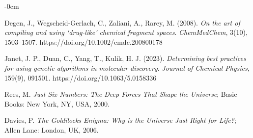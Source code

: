\documentclass[life,article,submit,pdftex,moreauthors]{Definitions/mdpi}
\begin{document}
\begin{adjustwidth}{-\extralength}{0cm}
{\begin{thebibliography}{999}
Degen, J., Wegscheid-Gerlach, C., Zaliani, A., Rarey, M. (2008).
\textit{On the art of compiling and using ‘drug-like’ chemical fragment spaces}.
\textit{ChemMedChem}, 3(10), 1503–1507. https://doi.org/10.1002/cmdc.200800178

Janet, J. P., Duan, C., Yang, T., Kulik, H. J. (2023).
\textit{Determining best practices for using genetic algorithms in molecular discovery}.
\textit{Journal of Chemical Physics}, 159(9), 091501. https://doi.org/10.1063/5.0158336

Rees, M. \textit{Just Six Numbers: The Deep Forces That Shape the Universe}; Basic Books: New York, NY, USA, 2000.

Davies, P. \textit{The Goldilocks Enigma: Why is the Universe Just Right for Life?}; Allen Lane: London, UK, 2006.


\end{thebibliography}
}



%


\PublishersNote{}
\end{adjustwidth}
\end{document}
